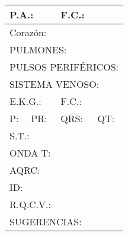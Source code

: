 \documentclass[10pt,a4paper]{article}
\begin{document}
\begin{center}
{\begin{tabular}{|p{2.8cm}p{2.8cm}p{2.8cm}p{2.8cm}|}
\hline 
\multicolumn{2}{|l}{ \scriptsize{P.A.: } } & \multicolumn{2}{l|}{ \scriptsize{F.C.: }} \\
\hline
\multicolumn{4}{|l|}{\begin{minipage}[t]{12.5 cm}\scriptsize{Coraz\'on: }\end{minipage}}\\
\hline
\multicolumn{4}{|l|}{\begin{minipage}[t]{12.5 cm}\scriptsize{PULMONES: }\end{minipage}}\\
\hline
\multicolumn{4}{|l|}{\begin{minipage}[t]{12.5 cm}\scriptsize{PULSOS PERIF\'ERICOS: }\end{minipage}}\\
\hline
\multicolumn{4}{|l|}{\begin{minipage}[t]{12.5 cm}\scriptsize{SISTEMA VENOSO: }\end{minipage}}\\
\hline
\multicolumn{2}{|l}{\begin{minipage}[t]{5.5 cm}\scriptsize{E.K.G.: }\end{minipage}}&\multicolumn{2}{l|}{\begin{minipage}[t]{5.5 cm}\scriptsize{F.C.: }\end{minipage}}\\
\hline
\scriptsize{P:}&\scriptsize{PR:}&\scriptsize{QRS:}&\scriptsize{QT:}\\
\hline 
\multicolumn{4}{|l|}{\begin{minipage}[t]{12.5 cm}\scriptsize{S.T.: }\end{minipage}}\\
\hline
\multicolumn{4}{|l|}{\begin{minipage}[t]{12.5 cm}\scriptsize{ONDA T: }\end{minipage}}\\
\hline
\multicolumn{4}{|l|}{\begin{minipage}[t]{12.5 cm}\scriptsize{AQRC: }\end{minipage}}\\
\hline 
\multicolumn{4}{|l|}{\begin{minipage}[t]{12.5 cm}\scriptsize{ID: }\end{minipage}}\\
\hline 
\multicolumn{4}{|l|}{\begin{minipage}[t]{12.5 cm}\scriptsize{R.Q.C.V.: }\end{minipage}}\\
\hline 
\multicolumn{4}{|l|}{\begin{minipage}[t]{12.5 cm}\scriptsize{SUGERENCIAS: }\end{minipage}}\\

\end{tabular}}
\end{center}
\end{document}
